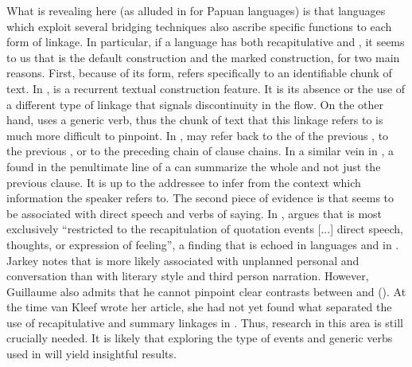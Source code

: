 \documentclass[output=paper]{LSP/langsci}
\begin{document}
What is revealing here (as alluded in \citealt{devries.2005} for Papuan languages) is that languages which exploit several bridging techniques also ascribe specific functions to each form of linkage. In particular, if a language has both recapitulative and , it seems to us that  is the default construction and  the marked construction, for two main reasons. First, because of its form,  refers specifically to an identifiable chunk of text. In  ,  is a recurrent textual construction feature. It is its absence or the use of a different type of linkage that signals discontinuity in the  flow. On the other hand,  uses a generic verb, thus the chunk of text that this linkage refers to is much more difficult to pinpoint. In  ,  may refer back to the  of the previous , to the previous , or to the preceding chain of clause chains. In a similar vein in  , a  found in the penultimate line of a  can summarize the whole  and not just the previous clause. It is up to the addressee to infer from the context which information the speaker refers to. The second piece of evidence is that  seems to be associated with direct speech and verbs of saying. In , \citet[][128--131]{Guillaume2011} argues that  is most exclusively ``restricted to the recapitulation of quotation events [...] direct speech, thoughts, or expression of feeling'', a finding that is echoed in  languages  and in  . Jarkey notes that  is more likely associated with unplanned personal  and conversation than with literary style and third person narration. However, Guillaume also admits that he cannot pinpoint clear contrasts between  and  (\citeyear[][130]{Guillaume2011}). At the time van Kleef wrote her article, she had not yet found what separated the use of recapitulative and summary linkages in \citet[][155]{kleef88}. Thus, research in this area is still crucially needed. It is likely that exploring the type of events and generic verbs used in  will yield insightful results.
\end{document}
